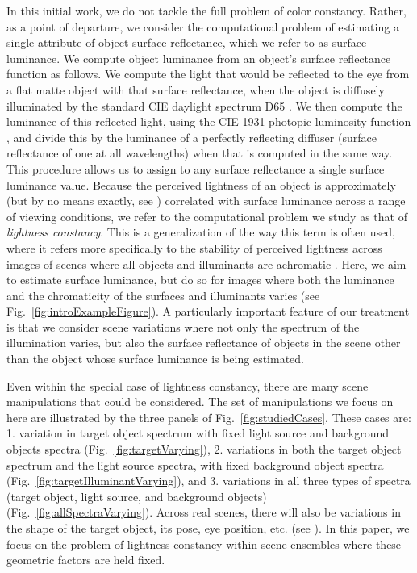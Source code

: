 \documentclass{jov}
\begin{document}
In this initial work, we do not tackle the full problem of color constancy.  Rather, as a point of departure, we consider the computational problem of estimating a single attribute of object surface reflectance, which we refer to as surface luminance.  We compute object luminance from an object's surface reflectance function as follows.  We compute the light that would be reflected to the eye from a flat matte object with that surface reflectance, when the object is diffusely illuminated by the standard CIE daylight spectrum D65 \cite{CIE86}.  We then compute the luminance of this reflected light, using the CIE 1931 photopic luminosity function \cite{CIE86}, and divide this by the luminance of a perfectly reflecting diffuser (surface reflectance of one at all wavelengths) when that is computed in the same way. This procedure allows us to assign to any surface reflectance a single surface luminance value.  Because the perceived lightness of an object is approximately (but by no means exactly, see ) correlated with surface luminance across a range of viewing conditions, we refer to the computational problem we study as that of {\em lightness constancy}.
This is a generalization of the way this term is often used, where it refers more specifically to the stability of perceived lightness across images of scenes where all objects and illuminants are achromatic \cite{gilchrist2006seeing}.
Here, we aim to estimate surface luminance, but do so for images where both the luminance and the chromaticity of the surfaces and illuminants varies (see  Fig.~\ref{fig:introExampleFigure}). A particularly important feature of our treatment is that we consider scene variations where not only the spectrum of the illumination varies, but also the surface reflectance of objects in the scene other than the object whose surface luminance is being estimated. 

Even within the special case of lightness constancy, there are many scene manipulations that could be considered. The set of manipulations we focus on here are illustrated by the three panels of Fig.~\ref{fig:studiedCases}. These cases are: 1. variation in target object spectrum with fixed light source and background objects spectra (Fig.~\ref{fig:targetVarying}), 2. variations in both the target object spectrum and the light source spectra, with fixed background object spectra (Fig.~\ref{fig:targetIlluminantVarying}), and 3. variations in all three types of spectra (target object, light source, and background objects) (Fig.~\ref{fig:allSpectraVarying}). Across real scenes, there will also be variations in the shape of the target object, its pose, eye position, etc. (see ). In this paper, we focus on the problem of lightness constancy within scene ensembles where these geometric factors are held fixed.
\end{document}
